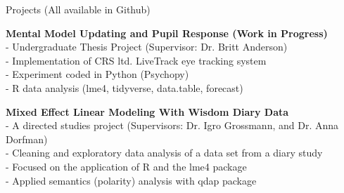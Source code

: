 \documentclass{resume} %
\begin{document}
\begin{rSection}{Projects (All available in Github)}

	{\bf Mental Model Updating and Pupil Response (Work in Progress)}
	\\- Undergraduate Thesis Project (Supervisor: Dr. Britt Anderson)
	\\- Implementation of CRS ltd. LiveTrack eye tracking system
	\\- Experiment coded in Python (Psychopy)
	\\- R data analysis (lme4, tidyverse, data.table, forecast)
	
	{\bf Mixed Effect Linear Modeling With Wisdom Diary Data}
	\\- A directed studies project (Supervisors: Dr. Igro Grossmann, and Dr. Anna Dorfman)
	\\- Cleaning and exploratory data analysis of a data set from a diary study
	\\- Focused on the application of R and the lme4 package
	\\- Applied semantics (polarity) analysis with qdap package


\end{rSection}
\end{document}
